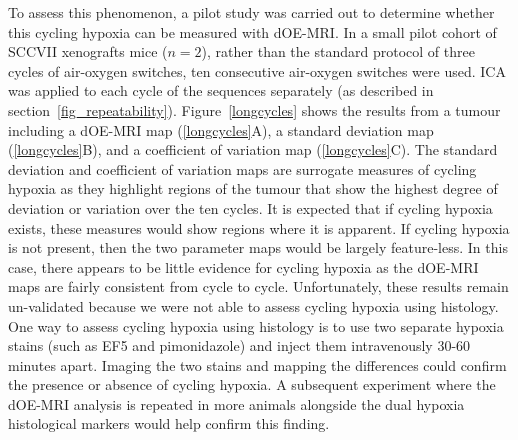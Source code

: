 To assess this phenomenon, a pilot study was carried out to determine whether this cycling hypoxia can be measured with \acs{dOE-MRI}.
In a small pilot cohort of SCCVII xenografts mice ($n=2$), rather than the standard protocol of three cycles of air-oxygen switches, ten consecutive air-oxygen switches were used.
\acs{ICA} was applied to each cycle of the sequences separately (as described in section~\ref{fig_repeatability}).
Figure~\ref{longcycles} shows the results from a tumour including a \acs{dOE-MRI} map (\ref{longcycles}A), a standard deviation map (\ref{longcycles}B), and a coefficient of variation map (\ref{longcycles}C).
The standard deviation and coefficient of variation maps are surrogate measures of cycling hypoxia as they highlight regions of the tumour that show the highest degree of deviation or variation over the ten cycles.
It is expected that if cycling hypoxia exists, these measures would show regions where it is apparent. 
If cycling hypoxia is not present, then the two parameter maps would be largely feature-less.
In this case, there appears to be little evidence for cycling hypoxia as the \acs{dOE-MRI} maps are fairly consistent from cycle to cycle.
Unfortunately, these results remain un-validated because we were not able to assess cycling hypoxia using histology.
One way to assess cycling hypoxia using histology is to use two separate hypoxia stains (such as EF5 and pimonidazole) and inject them intravenously 30-60 minutes apart.
Imaging the two stains and mapping the differences could confirm the presence or absence of cycling hypoxia. 
A subsequent experiment where the \acs{dOE-MRI} analysis is repeated in more animals alongside the dual hypoxia histological markers would help confirm this finding.

